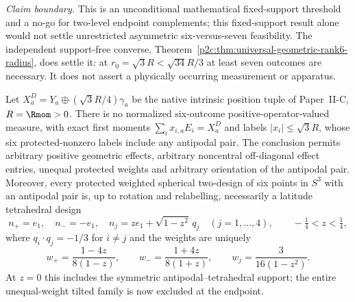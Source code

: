 \documentclass[12pt,a4paper]{article}
\begin{document}
\noindent\emph{Claim boundary.} This is an unconditional mathematical
fixed-support threshold and a no-go for two-level endpoint complements;
this fixed-support result alone would not settle unrestricted asymmetric
six-versus-seven feasibility.  The independent support-free converse,
Theorem~\ref{p2c:thm:universal-geometric-rank6-radius}, does settle it:
at $r_0=\sqrt3R<\sqrt{34}R/3$ at least seven outcomes are necessary.
It does not assert a physically occurring measurement or apparatus.

\begin{theorem}
\label{p2c:thm:gc20-antipodal-free-six}
Let $X^D_a=Y_a\oplus(\sqrt3R/4)\gamma_a$ be the native intrinsic
position tuple of Paper~II-C, $R=\Rmom>0$.
There is no normalized six-outcome positive-operator-valued measure,
with exact first moments $\sum_i x_{i,a}E_i=X^D_a$ and labels
$\lvert x_i\rvert\le\sqrt3R$, whose six protected-nonzero labels
include any antipodal pair. The conclusion permits arbitrary positive
geometric effects, arbitrary noncentral off-diagonal effect entries,
unequal protected weights and arbitrary orientation of the antipodal pair.
Moreover, every protected weighted spherical two-design of six points
in $S^3$ with an antipodal pair is, up to rotation and relabelling,
necessarily a latitude tetrahedral design
\[
 n_+=e_1,\quad n_-=-e_1,\quad
 n_j=z e_1+\sqrt{1-z^2}\,q_j\quad(j=1,\dots,4),
 \qquad -\tfrac14<z<\tfrac14,
\]
where $q_i\cdot q_j=-1/3$ for $i\ne j$ and the weights are uniquely
\[
 w_+=\frac{1-4z}{8(1-z)},\qquad
 w_-=\frac{1+4z}{8(1+z)},\qquad
 w_j=\frac3{16(1-z^2)}.
\]
At $z=0$ this includes the symmetric antipodal--tetrahedral support;
the entire unequal-weight tilted family is now excluded at the endpoint.
\end{theorem}
\end{document}
